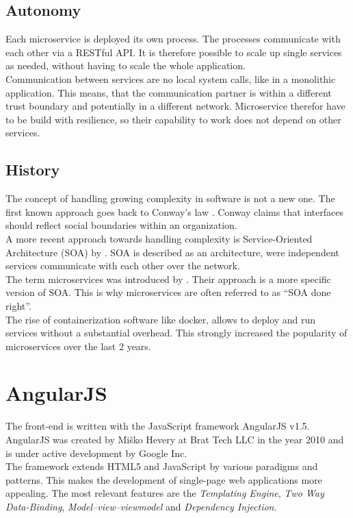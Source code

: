 \subsection{Autonomy}
Each microservice is deployed its own process. The processes communicate with each other via a RESTful API. It is therefore possible to scale up single services as needed, without having to scale the whole application.\\
Communication between services are no local system calls, like in a monolithic application. This means, that the communication partner is within a different trust boundary and potentially in a different network. Microservice therefor have to be build with resilience, so their capability to work does not depend on other services.


\subsection{History}
The concept of handling growing complexity in software is not a new one. The first known approach goes back to Conway's law \cite{conway1968committees}. Conway claims that interfaces should reflect social boundaries within an organization.\\
A more recent approach towards handling complexity is Service-Oriented Architecture (SOA) by \cite{as2005service}. SOA is described as an architecture, were independent services communicate with each other over the network.\\
The term microservices was introduced by \cite{martinfowler2014microservices}. Their approach is a more specific version of SOA. This is why microservices are often referred to as \enquote{SOA done right}.\\
The rise of containerization software like docker, allows to deploy and run services without a substantial overhead. This strongly increased the popularity of microservices over the last 2 years.



\section{AngularJS}
\label{sec:angularjs}
The front-end is written with the JavaScript framework AngularJS v1.5. AngularJS was created by Miško Hevery at Brat Tech LLC in the year 2010 and is under active development by Google Inc. \\
The framework extends HTML5 and JavaScript by various paradigms and patterns. This makes the development of single-page web applications more appealing. The most relevant features are the \textit{Templating Engine}, \textit{Two Way Data-Binding}, \textit{Model–view–viewmodel} and \textit{Dependency Injection}.


